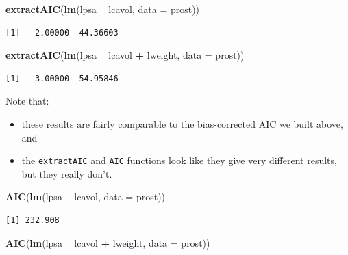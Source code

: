 \documentclass[]{book}
\newenvironment{Shaded}{\begin{snugshade}}{\end{snugshade}}
\newcommand{\KeywordTok}[1]{\textcolor[rgb]{0.13,0.29,0.53}{\textbf{#1}}}
\newcommand{\DataTypeTok}[1]{\textcolor[rgb]{0.13,0.29,0.53}{#1}}
\newcommand{\StringTok}[1]{\textcolor[rgb]{0.31,0.60,0.02}{#1}}
\newcommand{\OperatorTok}[1]{\textcolor[rgb]{0.81,0.36,0.00}{\textbf{#1}}}
\newcommand{\NormalTok}[1]{#1}
\providecommand{\tightlist}{%
  \setlength{\itemsep}{0pt}\setlength{\parskip}{0pt}}
\theoremstyle{definition}
\theoremstyle{definition}
\theoremstyle{definition}
\theoremstyle{remark}
\begin{document}
\begin{Shaded}
\begin{Highlighting}[]
\KeywordTok{extractAIC}\NormalTok{(}\KeywordTok{lm}\NormalTok{(lpsa }\OperatorTok{~}\StringTok{ }\NormalTok{lcavol, }\DataTypeTok{data =}\NormalTok{ prost))}
\end{Highlighting}
\end{Shaded}

\begin{verbatim}
[1]   2.00000 -44.36603
\end{verbatim}

\begin{Shaded}
\begin{Highlighting}[]
\KeywordTok{extractAIC}\NormalTok{(}\KeywordTok{lm}\NormalTok{(lpsa }\OperatorTok{~}\StringTok{ }\NormalTok{lcavol }\OperatorTok{+}\StringTok{ }\NormalTok{lweight, }\DataTypeTok{data =}\NormalTok{ prost))}
\end{Highlighting}
\end{Shaded}

\begin{verbatim}
[1]   3.00000 -54.95846
\end{verbatim}

Note that:

\begin{itemize}
\tightlist
\item
  these results are fairly comparable to the bias-corrected AIC we built
  above, and
\item
  the \texttt{extractAIC} and \texttt{AIC} functions look like they give
  very different results, but they really don't.
\end{itemize}

\begin{Shaded}
\begin{Highlighting}[]
\KeywordTok{AIC}\NormalTok{(}\KeywordTok{lm}\NormalTok{(lpsa }\OperatorTok{~}\StringTok{ }\NormalTok{lcavol, }\DataTypeTok{data =}\NormalTok{ prost))}
\end{Highlighting}
\end{Shaded}

\begin{verbatim}
[1] 232.908
\end{verbatim}

\begin{Shaded}
\begin{Highlighting}[]
\KeywordTok{AIC}\NormalTok{(}\KeywordTok{lm}\NormalTok{(lpsa }\OperatorTok{~}\StringTok{ }\NormalTok{lcavol }\OperatorTok{+}\StringTok{ }\NormalTok{lweight, }\DataTypeTok{data =}\NormalTok{ prost))}
\end{Highlighting}
\end{Shaded}
\end{document}
